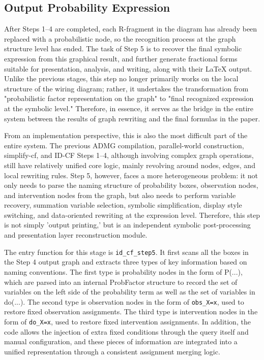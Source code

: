 \documentclass[a4paper]{report}
\begin{document}
\subsection{Output Probability Expression}
After Steps 1–4 are completed, each R-fragment in the diagram has already been replaced with a probabilistic node, so the recognition process at the graph structure level has ended. The task of Step 5 is to recover the final symbolic expression from this graphical result, and further generate fractional forms suitable for presentation, analysis, and writing, along with their LaTeX output. Unlike the previous stages, this step no longer primarily works on the local structure of the wiring diagram; rather, it undertakes the transformation from "probabilistic factor representation on the graph" to "final recognized expression at the symbolic level." Therefore, in essence, it serves as the bridge in the entire system between the results of graph rewriting and the final formulas in the paper.

From an implementation perspective, this is also the most difficult part of the entire system. The previous ADMG compilation, parallel-world construction, simplify-cf, and ID-CF Steps 1–4, although involving complex graph operations, still have relatively unified core logic, mainly revolving around nodes, edges, and local rewriting rules. Step 5, however, faces a more heterogeneous problem: it not only needs to parse the naming structure of probability boxes, observation nodes, and intervention nodes from the graph, but also needs to perform variable recovery, summation variable selection, symbolic simplification, display style switching, and data-oriented rewriting at the expression level. Therefore, this step is not simply 'output printing,' but is an independent symbolic post-processing and presentation layer reconstruction module.

The entry function for this stage is \texttt{id\_cf\_step5}. It first scans all the boxes in the Step 4 output graph and extracts three types of key information based on naming conventions. The first type is probability nodes in the form of P(...), which are parsed into an internal ProbFactor structure to record the set of variables on the left side of the probability term as well as the set of variables in do(...). The second type is observation nodes in the form of \texttt{obs\_X=x}, used to restore fixed observation assignments. The third type is intervention nodes in the form of \texttt{do\_X=x}, used to restore fixed intervention assignments. In addition, the code allows the injection of extra fixed conditions through the query itself and manual configuration, and these pieces of information are integrated into a unified representation through a consistent assignment merging logic.
\end{document}
